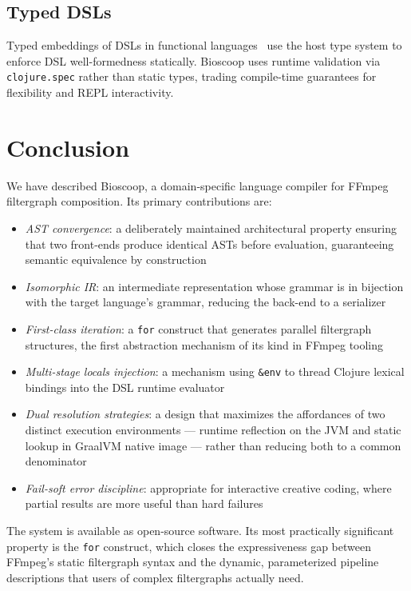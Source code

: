 \documentclass[conference]{IEEEtran}
\begin{document}
\subsection{Typed DSLs}

Typed embeddings of DSLs in functional languages~\cite{carette} use the host type system to enforce DSL well-formedness statically. Bioscoop uses runtime validation via \texttt{clojure.spec} rather than static types, trading compile-time guarantees for flexibility and REPL interactivity.

\section{Conclusion}

We have described Bioscoop, a domain-specific language compiler for FFmpeg filtergraph composition. Its primary contributions are:

\begin{itemize}
\item \emph{AST convergence}: a deliberately maintained architectural property ensuring that two front-ends produce identical ASTs before evaluation, guaranteeing semantic equivalence by construction
\item \emph{Isomorphic IR}: an intermediate representation whose grammar is in bijection with the target language's grammar, reducing the back-end to a serializer
\item \emph{First-class iteration}: a \texttt{for} construct that generates parallel filtergraph structures, the first abstraction mechanism of its kind in FFmpeg tooling
\item \emph{Multi-stage locals injection}: a mechanism using \texttt{\&env} to thread Clojure lexical bindings into the DSL runtime evaluator
\item \emph{Dual resolution strategies}: a design that maximizes the affordances of two distinct execution environments --- runtime reflection on the JVM and static lookup in GraalVM native image --- rather than reducing both to a common denominator
\item \emph{Fail-soft error discipline}: appropriate for interactive creative coding, where partial results are more useful than hard failures
\end{itemize}

The system is available as open-source software. Its most practically significant property is the \texttt{for} construct, which closes the expressiveness gap between FFmpeg's static filtergraph syntax and the dynamic, parameterized pipeline descriptions that users of complex filtergraphs actually need.
\end{document}

